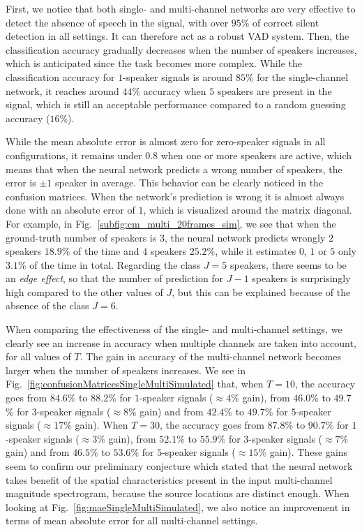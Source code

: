 First, we notice that both single- and multi-channel networks are very effective to detect the absence of speech in the signal, with over $95$\% of correct silent detection in all settings. It can therefore act as a robust VAD system. Then, the classification accuracy gradually decreases when the number of speakers increases, which is anticipated since the task becomes more complex. While the classification accuracy for $1$-speaker signals is around $85$\% for the single-channel network, it reaches around $44$\% accuracy when $5$ speakers are present in the signal, which is still an acceptable performance compared to a random guessing accuracy ($16$\%). 

While the mean absolute error is almost zero for zero-speaker signals in all configurations, it remains under $0.8$ when one or more speakers are active, which means that when the neural network predicts a wrong number of speakers, the error is $\pm 1$ speaker in average. This behavior can be clearly noticed in the confusion matrices. When the network's prediction is wrong it is almost always done with an absolute error of $1$, which is visualized around the matrix diagonal. For example, in Fig.~\ref{subfig:cm_multi_20frames_sim}, we see that when the ground-truth number of speakers is $3$, the neural network predicts wrongly $2$ speakers $18.9$\% of the time and $4$ speakers $25.2$\%, while it estimates $0$, $1$ or $5$ only $3.1$\% of the time in total. Regarding the class $J=5$ speakers, there seems to be an \textit{edge effect}, so that the number of prediction for $J-1$ speakers is surprisingly high compared to the other values of $J$, but this can be explained because of the absence of the class $J=6$.

When comparing the effectiveness of the single- and multi-channel settings, we clearly see an increase in accuracy when multiple channels are taken into account, for all values of $T$. The gain in accuracy of the multi-channel network becomes larger when the number of speakers increases. We see in Fig.~\ref{fig:confusionMatricesSingleMultiSimulated} that, when $T=10$, the accuracy goes from $84.6$\% to $88.2$\% for $1$-speaker signals ($\approx 4$\% gain), from $46.0$\% to $49.7$\% for $3$-speaker signals ($\approx 8$\% gain) and from $42.4$\% to $49.7$\% for $5$-speaker signals ($\approx 17$\% gain). When $T=30$, the accuracy goes from $87.8$\% to $90.7$\% for $1$-speaker signals ($\approx 3$\% gain), from $52.1$\% to $55.9$\% for $3$-speaker signals ($\approx 7$\% gain) and from $46.5$\% to $53.6$\% for $5$-speaker signals ($\approx 15$\% gain). These gains seem to confirm our preliminary conjecture which stated that the neural network takes benefit of the spatial characteristics present in the input multi-channel magnitude spectrogram, because the source locations are distinct enough. When looking at Fig.~\ref{fig:maeSingleMultiSimulated}, we also notice an improvement in terms of mean absolute error for all multi-channel settings.

